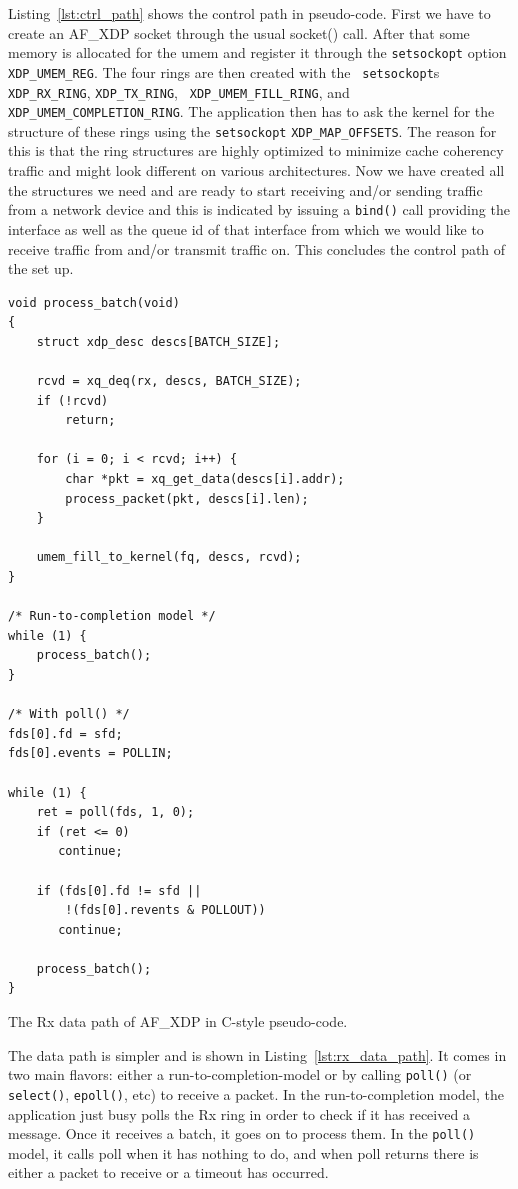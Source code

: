 \documentclass[9pt,numbers,reprint]{sigplanconf}
\begin{document}
Listing~\ref{lst:ctrl_path} shows the control path in
pseudo-code. First we have to create an AF\_XDP socket through the
usual socket() call. After that some memory is allocated for the umem
and register it through the {\tt setsockopt} option {\tt
  XDP\_UMEM\_REG}. The four rings are then created with the {\tt
  setsockopt}s {\tt XDP\_RX\_RING}, {\tt XDP\_TX\_RING}, {\tt
  XDP\_UMEM\_FILL\_RING}, and {\tt XDP\_UMEM\_COMPLETION\_RING}. The
application then has to ask the kernel for the structure of these
rings using the {\tt setsockopt} {\tt XDP\_MAP\_OFFSETS}. The reason
for this is that the ring structures are highly optimized to minimize
cache coherency traffic and might look different on various
architectures. Now we have created all the structures we need and are
ready to start receiving and/or sending traffic from a network device
and this is indicated by issuing a {\tt bind()} call providing the
interface as well as the queue id of that interface from which we
would like to receive traffic from and/or transmit traffic on. This
concludes the control path of the set up.

\begin{listing}[p]
\begin{verbatim}
void process_batch(void)
{
    struct xdp_desc descs[BATCH_SIZE];

    rcvd = xq_deq(rx, descs, BATCH_SIZE);
    if (!rcvd)
        return;

    for (i = 0; i < rcvd; i++) {
        char *pkt = xq_get_data(descs[i].addr);
        process_packet(pkt, descs[i].len);
    }

    umem_fill_to_kernel(fq, descs, rcvd);
}

/* Run-to-completion model */
while (1) {
    process_batch();
}

/* With poll() */
fds[0].fd = sfd;
fds[0].events = POLLIN;

while (1) {
    ret = poll(fds, 1, 0);
    if (ret <= 0)
       continue;

    if (fds[0].fd != sfd ||
        !(fds[0].revents & POLLOUT))
       continue;

    process_batch();
}
\end{verbatim}
\caption{The Rx data path of AF\_XDP in C-style pseudo-code.}
\label{lst:rx_data_path}
\end{listing}

The data path is simpler and is shown in
Listing~\ref{lst:rx_data_path}. It comes in two main flavors: either a
run-to-completion-model or by calling {\tt poll()} (or {\tt select()},
{\tt epoll()}, etc) to receive a packet. In the run-to-completion
model, the application just busy polls the Rx ring in order to check
if it has received a message. Once it receives a batch, it goes on to
process them. In the {\tt poll()} model, it calls poll when it has
nothing to do, and when poll returns there is either a packet to
receive or a timeout has occurred.
\end{document}
